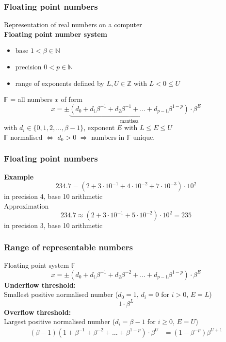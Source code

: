 \documentclass{beamer}
\begin{document}
\begin{frame}
\frametitle{Floating point numbers}
Representation of real numbers on a computer\\
\textbf{Floating point number system}
\begin{itemize}
\item base $1<\beta\in\mathbb{N}$
\item precision $0<p\in\mathbb{N}$
\item range of exponents defined by $L,U\in\mathbb{Z}$ with $L<0\le U$
\end{itemize}
$\mathbb{F}$ = all numbers $x$ of form
$$
x = \pm \underbrace{\left(d_0 + d_1\beta^{-1} + d_2\beta^{-1} + \dots+d_{p-1}\beta^{1-p}\right)}_{\text{mantissa}}\cdot\beta^E
$$
with $d_i\in \{0,1,2,\dots,\beta-1\}$, exponent $E$ with $L\le E\le U$\\[1ex]

$\mathbb{F}$ normalised $\Leftrightarrow$ $d_0>0$ $\Rightarrow$ numbers in $\mathbb{F}$ unique.

\end{frame}


\begin{frame}
\frametitle{Floating point numbers}
\textbf{Example}
$$
234.7 = \left(2+3\cdot 10^{-1}+4\cdot 10^{-2} +7\cdot 10^{-3}\right)\cdot 10^2
$$
in precision 4, base 10 arithmetic\\[2ex]
Approximation
$$
234.7 \approx \left(2+3\cdot 10^{-1}+5\cdot 10^{-2}\right)\cdot 10^2 = 235
$$
in precision 3, base 10 arithmetic

\end{frame}


\begin{frame}
\frametitle{Range of representable numbers}
Floating point system $\mathbb{F}$
$$
x = \pm \left(d_0 + d_1\beta^{-1} + d_2\beta^{-2} + \dots+d_{p-1}\beta^{1-p}\right)\cdot\beta^E
$$
\textbf{Underflow threshold:}\\
Smallest positive normalised number {\footnotesize($d_0=1$, $d_i=0$ for $i>0$, $E=L$)}
$$
1\cdot \beta^L
$$
\textbf{Overflow threshold:}\\
Largest positive normalised number {\footnotesize ($d_i=\beta-1$ for $i\ge 0$, $E=U$)}
$$
\begin{aligned}
(\beta-1)\left(1+\beta^{-1}+\beta^{-2}+\dots+\beta^{1-p}\right)\cdot \beta^U &= (1-\beta^{-p})\beta^{U+1}
\end{aligned}
$$
\end{frame}
\end{document}
